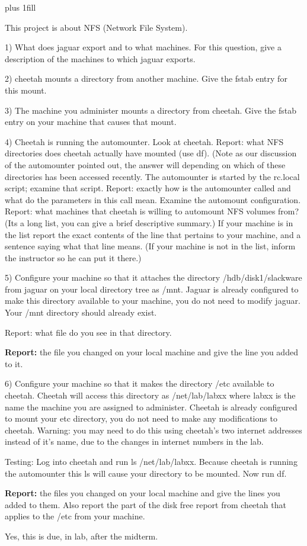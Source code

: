 
\rightskip=0pt plus 1fill

\parindent 0pt

This project is about NFS (Network File System).

1) What does jaguar export and to what machines.
For this question, give a description of the machines to which
jaguar exports.

2) cheetah mounts a directory from another machine.
Give the fstab entry for this mount.

3) The machine you administer mounts a directory from cheetah.
Give the fstab entry on your machine that causes that mount.

4) Cheetah is running the automounter.
Look at cheetah. 
Report: what NFS directories does cheetah actually have mounted 
(use {\ltt{}df}).
(Note as our discussion of the automounter pointed out, the answer will
depending on which of these directories has been accessed recently.
The automounter is started by the {\ltt{}rc.local} script;
examine that script.
Report: exactly how is the automounter called and
what do the parameters in this call mean.
Examine the automount configuration.
Report: what machines that cheetah is willing to automount NFS volumes from?
(Its a long list, you can give a brief descriptive summary.)
If your machine is in the list report the exact contents of the
line that pertains to your machine, and a sentence saying what that
line means.
(If your machine is not in the list, inform the instructor so he can put it
there.)

5) Configure your machine so that it attaches the directory
{\ltt{}/hdb/disk1/slackware} from jaguar on your local directory tree
as {\ltt{}/mnt}.
Jaguar is already configured to make this directory available to your
machine, you do not need to modify jaguar.
Your {\ltt{}/mnt} directory should already exist.

Report: what file do you see in that directory.

{\bf Report:} the file you changed on your local machine and give the line
you added to it.

6) Configure your machine so that it makes the directory
{\ltt{}/etc} available to cheetah.
Cheetah will access this directory as {\ltt{}/net/lab/labxx} where {\ltt{}labxx}
is the name the machine you are assigned to administer.
Cheetah is already configured to mount your {\ltt{}etc} directory,
you do not need to make any modifications to cheetah.
Warning: you may need to do this using cheetah's two internet addresses
instead of it's name, due to the changes in internet numbers in the lab.

Testing: Log into cheetah and run {\ltt{}ls /net/lab/labxx}.
Because cheetah is running the automounter
this {\ltt{}ls} will cause your directory to be mounted.
Now run {\ltt{}df}.

{\bf Report:} the files you changed on your local machine and give the lines 
you added to them.
Also report the part of the disk free report from cheetah that applies to 
the {\ltt{}/etc} from your machine.

Yes, this is due, in lab, after the midterm.
\bye
